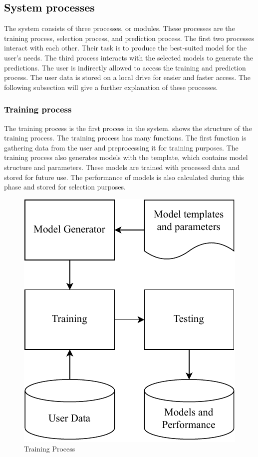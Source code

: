 \documentclass[a4paper,fleqn]{cas-dc}
\newcommand{\responsemod}{\color{black}}
\newcommand{\responsemodsm}[1]{\textcolor{black}{#1}}
\newcommand{\subsectionb}[1]{\subsection{\responsemodsm{#1}}}
\newcommand{\subsubsectionb}[1]{\subsubsection{\responsemodsm{#1}}}
\begin{document}
\subsectionb{System processes}\label{subsec:system_processes}

{\responsemod
    The system consists of three processes, or modules. These processes are the training process, selection process, and prediction process. The first two processes interact with each other. Their task is to produce the best-suited model for the user's needs. The third process interacts with the selected models to generate the predictions. The user is indirectly allowed to access the training and prediction process. The user data is stored on a local drive for easier and faster access. The following subsection will give a further explanation of these processes.
}

\subsubsectionb{Training process}\label{subsubsec:training_process}

The training process is the first process in the system.  shows the structure of the training process. The training process has many functions. The first function is gathering data from the user and preprocessing it for training purposes. The training process also generates models with the template, which contains model structure and parameters. These models are trained with processed data and stored for future use. The performance of models is also calculated during this phase and stored for selection purposes.

\begin{figure}[ht]
    \centering
    \includegraphics[width=0.7\columnwidth]{training_and_testing.pdf}
    \caption{Training Process}
    \label{fig:training_process}
\end{figure}
\end{document}

